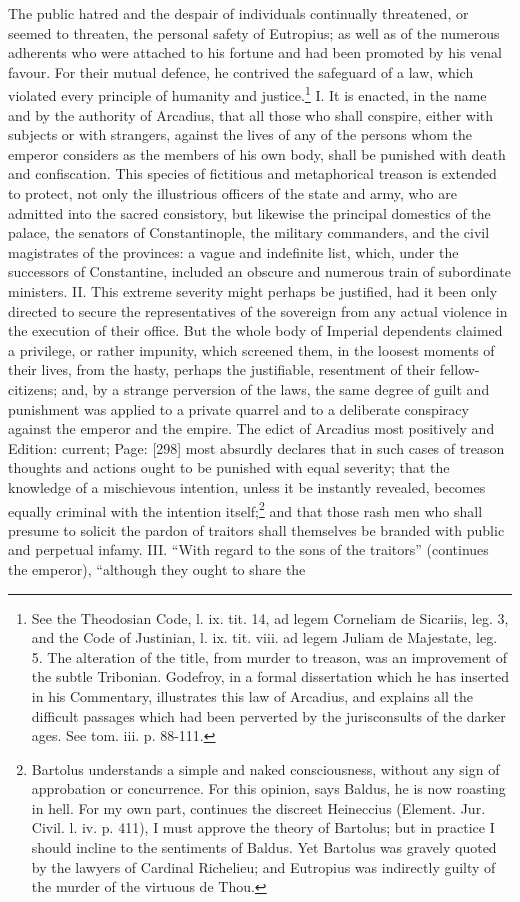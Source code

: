 The public hatred and the despair of individuals continually threatened, or seemed to threaten, the personal safety of Eutropius; as well as of the numerous adherents who were attached to his fortune and had been promoted by his venal favour. For their mutual defence, he contrived the safeguard of a law, which violated every principle of humanity and justice.\footnote{See the Theodosian Code, l. ix. tit. 14, ad legem Corneliam de Sicariis, leg. 3, and the Code of Justinian, l. ix. tit. viii. ad legem Juliam de Majestate, leg. 5. The alteration of the title, from murder to treason, was an improvement of the subtle Tribonian. Godefroy, in a formal dissertation which he has inserted in his Commentary, illustrates this law of Arcadius, and explains all the difficult passages which had been perverted by the jurisconsults of the darker ages. See tom. iii. p. 88-111.} I. It is enacted, in the name and by the authority of Arcadius, that all those who shall conspire, either with subjects or with strangers, against the lives of any of the persons whom the emperor considers as the members of his own body, shall be punished with death and confiscation. This species of fictitious and metaphorical treason is extended to protect, not only the illustrious officers of the state and army, who are admitted into the sacred consistory, but likewise the principal domestics of the palace, the senators of Constantinople, the military commanders, and the civil magistrates of the provinces: a vague and indefinite list, which, under the successors of Constantine, included an obscure and numerous train of subordinate ministers. II. This extreme severity might perhaps be justified, had it been only directed to secure the representatives of the sovereign from any actual violence in the execution of their office. But the whole body of Imperial dependents claimed a privilege, or rather impunity, which screened them, in the loosest moments of their lives, from the hasty, perhaps the justifiable, resentment of their fellow-citizens; and, by a strange perversion of the laws, the same degree of guilt and punishment was applied to a private quarrel and to a deliberate conspiracy against the emperor and the empire. The edict of Arcadius most positively and Edition: current; Page: [298] most absurdly declares that in such cases of treason thoughts and actions ought to be punished with equal severity; that the knowledge of a mischievous intention, unless it be instantly revealed, becomes equally criminal with the intention itself;\footnote{Bartolus understands a simple and naked consciousness, without any sign of approbation or concurrence. For this opinion, says Baldus, he is now roasting in hell. For my own part, continues the discreet Heineccius (Element. Jur. Civil. l. iv. p. 411), I must approve the theory of Bartolus; but in practice I should incline to the sentiments of Baldus. Yet Bartolus was gravely quoted by the lawyers of Cardinal Richelieu; and Eutropius was indirectly guilty of the murder of the virtuous de Thou.} and that those rash men who shall presume to solicit the pardon of traitors shall themselves be branded with public and perpetual infamy. III. \texthebrew{“}With regard to the sons of the traitors\texthebrew{}” (continues the emperor), \texthebrew{“}although they ought to share the 